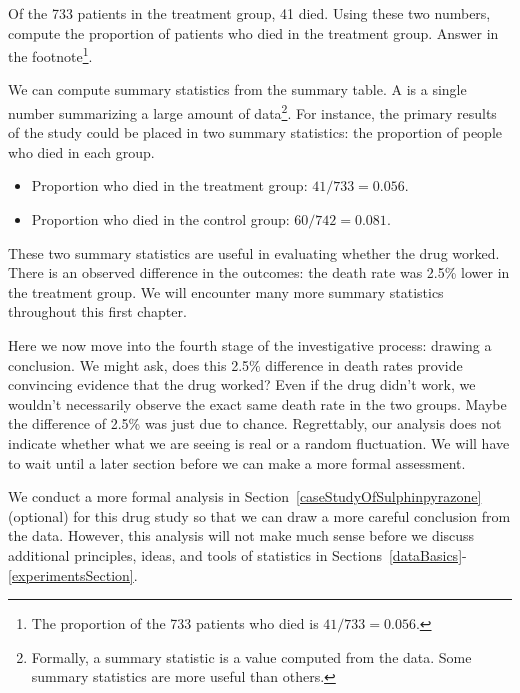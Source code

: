 \begin{exercise}
Of the 733 patients in the treatment group, 41 died. Using these two numbers, compute the proportion of patients who died in the treatment group. Answer in the footnote\footnote{The proportion of the 733 patients who died is $41/733 = 0.056$.}.
\end{exercise}

We can compute summary statistics from the summary table. A  is a single number summarizing a large amount of data\footnote{Formally, a summary statistic is a value computed from the data. Some summary statistics are more useful than others.}. For instance, the primary results of the study could be placed in two summary statistics: the proportion of people who died in each group.
\begin{itemize}
\setlength{\itemsep}{0mm}
\item[] Proportion who died in the treatment group: $41/733 = 0.056$.
\item[] Proportion who died in the control group: $60/742 = 0.081$.
\end{itemize}
These two summary statistics are useful in evaluating whether the drug worked. There is an observed difference in the outcomes: the death rate was 2.5\% lower in the treatment group. We will encounter many more summary statistics throughout this first chapter.

Here we now move into the fourth stage of the investigative process: drawing a conclusion. We might ask, does this 2.5\% difference in death rates provide convincing evidence that the drug worked? Even if the drug didn't work, we wouldn't necessarily observe the exact same death rate in the two groups. Maybe the difference of 2.5\% was just due to chance. Regrettably, our analysis does not indicate whether what we are seeing is real or a random fluctuation. We will have to wait until a later section before we can make a more formal assessment.

We conduct a more formal analysis in Section~\ref{caseStudyOfSulphinpyrazone} (optional) for this drug study so that we can draw a more careful conclusion from the data. However, this analysis will not make much sense before we discuss additional principles, ideas, and tools of statistics in Sections~\ref{dataBasics}-\ref{experimentsSection}. %

